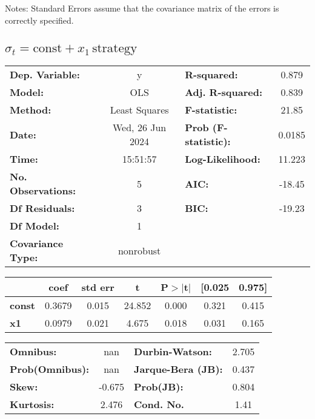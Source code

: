 \documentclass{article}
\begin{document}
Notes: \newline
[1] Standard Errors assume that the covariance matrix of the errors is correctly specified.

\subsection{$\sigma_t = \text{const} + x_1\,\text{strategy}$}

\begin{center}
    \begin{tabular}{lclc}
        \toprule
        \textbf{Dep. Variable:}    & y                & \textbf{  R-squared:         } & 0.879  \\
        \textbf{Model:}            & OLS              & \textbf{  Adj. R-squared:    } & 0.839  \\
        \textbf{Method:}           & Least Squares    & \textbf{  F-statistic:       } & 21.85  \\
        \textbf{Date:}             & Wed, 26 Jun 2024 & \textbf{  Prob (F-statistic):} & 0.0185 \\
        \textbf{Time:}             & 15:51:57         & \textbf{  Log-Likelihood:    } & 11.223 \\
        \textbf{No. Observations:} & 5                & \textbf{  AIC:               } & -18.45 \\
        \textbf{Df Residuals:}     & 3                & \textbf{  BIC:               } & -19.23 \\
        \textbf{Df Model:}         & 1                & \textbf{                     } &        \\
        \textbf{Covariance Type:}  & nonrobust        & \textbf{                     } &        \\
        \bottomrule
    \end{tabular}
    \begin{tabular}{lcccccc}
                       & \textbf{coef} & \textbf{std err} & \textbf{t} & \textbf{P$> |$t$|$} & \textbf{[0.025} & \textbf{0.975]} \\
        \midrule
        \textbf{const} & 0.3679        & 0.015            & 24.852     & 0.000               & 0.321           & 0.415           \\
        \textbf{x1}    & 0.0979        & 0.021            & 4.675      & 0.018               & 0.031           & 0.165           \\
        \bottomrule
    \end{tabular}
    \begin{tabular}{lclc}
        \textbf{Omnibus:}       & nan    & \textbf{  Durbin-Watson:     } & 2.705 \\
        \textbf{Prob(Omnibus):} & nan    & \textbf{  Jarque-Bera (JB):  } & 0.437 \\
        \textbf{Skew:}          & -0.675 & \textbf{  Prob(JB):          } & 0.804 \\
        \textbf{Kurtosis:}      & 2.476  & \textbf{  Cond. No.          } & 1.41  \\
        \bottomrule
    \end{tabular}
\end{center}
\end{document}
